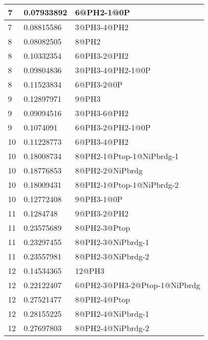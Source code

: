 \begin{center}
\begin{longtable}{|l|l|l|}
7 & 0.07933892 & 6@PH2-1@0P \\ \hline
7 & 0.08815586 & 3@PH3-4@PH2 \\ \hline
8 & 0.08082505 & 8@PH2 \\ \hline
8 & 0.10332354 & 6@PH3-2@PH2 \\ \hline
8 & 0.09804836 & 3@PH3-4@PH2-1@0P \\ \hline
8 & 0.11523834 & 6@PH3-2@0P \\ \hline
9 & 0.12897971 & 9@PH3 \\ \hline
9 & 0.09094516 & 3@PH3-6@PH2 \\ \hline
9 & 0.1074091 & 6@PH3-2@PH2-1@0P \\ \hline
10 & 0.11228773 & 6@PH3-4@PH2 \\ \hline
10 & 0.18008734 & 8@PH2-1@Ptop-1@NiPbrdg-1 \\ \hline
10 & 0.18776853 & 8@PH2-2@NiPbrdg \\ \hline
10 & 0.18009431 & 8@PH2-1@Ptop-1@NiPbrdg-2 \\ \hline
10 & 0.12772408 & 9@PH3-1@0P \\ \hline
11 & 0.1284748 & 9@PH3-2@PH2 \\ \hline
11 & 0.23575689 & 8@PH2-3@Ptop \\ \hline
11 & 0.23297455 & 8@PH2-3@NiPbrdg-1 \\ \hline
11 & 0.23557981 & 8@PH2-3@NiPbrdg-2 \\ \hline
12 & 0.14534365 & 12@PH3 \\ \hline
12 & 0.22122407 & 6@PH2-3@PH3-2@Ptop-1@NiPbrdg \\ \hline
12 & 0.27521477 & 8@PH2-4@Ptop \\ \hline
12 & 0.28155225 & 8@PH2-4@NiPbrdg-1 \\ \hline
12 & 0.27697803 & 8@PH2-4@NiPbrdg-2 \\ \hline

\end{longtable}
\end{center}
